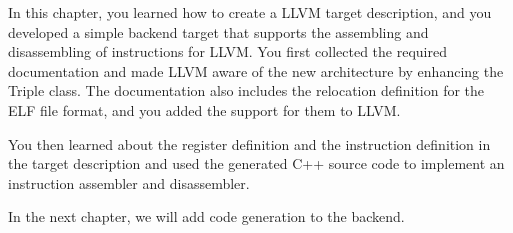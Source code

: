 In this chapter, you learned how to create a LLVM target description, and you developed a simple backend target that supports the assembling and disassembling of instructions for LLVM. You first collected the required documentation and made LLVM aware of the new architecture by enhancing the Triple class. The documentation also includes the relocation definition for the ELF file format, and you added the support for them to LLVM.

You then learned about the register definition and the instruction definition in the target description and used the generated C++ source code to implement an instruction assembler and disassembler.

In the next chapter, we will add code generation to the backend.